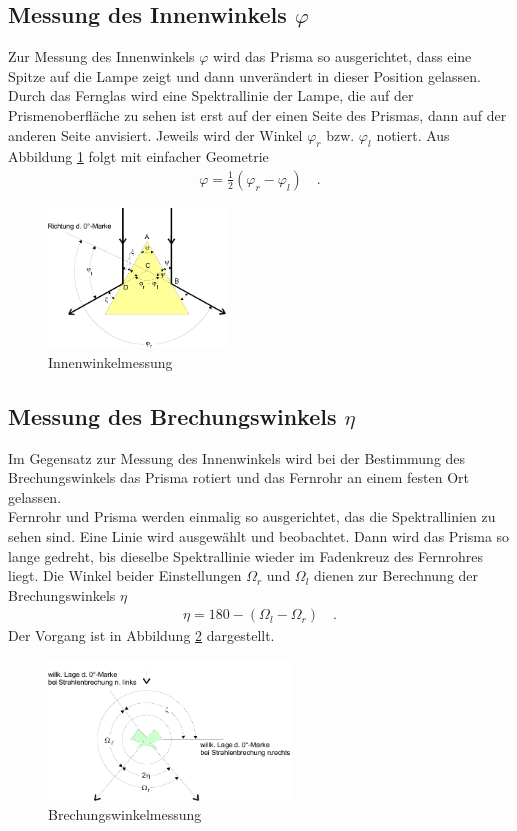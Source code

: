 \clearpage

\subsection{Messung des Innenwinkels $\varphi$}
Zur Messung des Innenwinkels $\varphi$ wird das Prisma so ausgerichtet, dass eine Spitze auf die Lampe zeigt und dann unverändert in dieser Position gelassen. Durch das Fernglas wird eine Spektrallinie der Lampe, die auf der Prismenoberfläche zu sehen ist erst auf der einen Seite des Prismas, dann auf der anderen Seite anvisiert. Jeweils wird der Winkel $\varphi_r$ bzw. $\varphi_l$ notiert. Aus Abbildung \ref{fig:prisma2} folgt mit einfacher Geometrie
\begin{align}\label{Phi}
	\varphi = \frac{1}{2} (\varphi_r - \varphi_l) \quad.
\end{align}

\begin{figure}[h!]
	\centering
	\includegraphics[width=0.42\textwidth]{Prisma2.png}
	\caption{Innenwinkelmessung \cite{V402}}
	\label{fig:prisma2}
\end{figure}

\subsection{Messung des Brechungswinkels $\eta$}
Im Gegensatz zur Messung des Innenwinkels wird bei der Bestimmung des Brechungswinkels das Prisma rotiert und das Fernrohr an einem festen Ort gelassen. \\
Fernrohr und Prisma werden einmalig so ausgerichtet, das die Spektrallinien zu sehen sind. Eine Linie wird ausgewählt und beobachtet. Dann wird das Prisma so lange gedreht, bis dieselbe Spektrallinie wieder im Fadenkreuz des Fernrohres liegt. Die Winkel beider Einstellungen $\Omega_r$ und $\Omega_l$ dienen zur Berechnung der Brechungswinkels $\eta$
\begin{align}\label{Eta}
	\eta = 180 - (\Omega_l - \Omega_r) \quad .
\end{align}
Der Vorgang ist in Abbildung \ref{fig:prisma3} dargestellt.

\begin{figure}[h!]
	\centering
	\includegraphics[width=0.57\textwidth]{Prisma3.png}
	\caption{Brechungswinkelmessung \cite{V402}}
	\label{fig:prisma3}
\end{figure}

